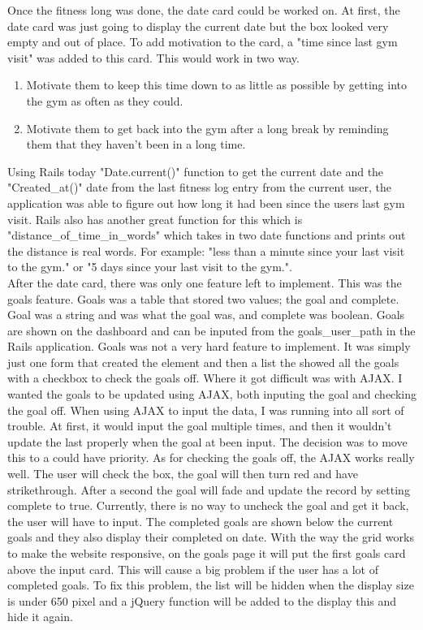 Once the fitness long was done, the date card could be worked on. At first, the date card was just going to display the current date but the box looked very empty and out of place. To add motivation to the card, a "time since last gym visit" was added to this card. This would work in two way. 

\begin{enumerate}
\item Motivate them to keep this time down to as little as possible by getting into the gym as often as they could.
\item Motivate them to get back into the gym after a long break by reminding them that they haven't been in a long time.
\end{enumerate}

Using Rails today "Date.current()" function to get the current date and the "Created_at()" date from the last fitness log entry from the current user, the application was able to figure out how long it had been since the users last gym visit. Rails also has another great function for this which is "distance_of_time_in_words" which takes in two date functions and prints out the distance is real words. For example: "less than a minute since your last visit to the gym." or "5 days since your last visit to the gym.".\\

After the date card, there was only one feature left to implement. This was the goals feature. Goals was a table that stored two values; the goal and complete. Goal was a string and was what the goal was, and complete was boolean. Goals are shown on the dashboard and can be inputed from the goals_user_path in the Rails application. Goals was not a very hard feature to implement. It was simply just one form that created the element and then a list the showed all the goals with a checkbox to check the goals off. Where it got difficult was with AJAX. I wanted the goals to be updated using AJAX, both inputing the goal and checking the goal off. When using AJAX to input the data, I was running into all sort of trouble. At first, it would input the goal multiple times, and then it wouldn't update the last properly when the goal at been input. The decision was to move this to a could have priority. As for checking the goals off, the AJAX works really well. The user will check the box, the goal will then turn red and have strikethrough. After a second the goal will fade and update the record by setting complete to true. Currently, there is no way to uncheck the goal and get it back, the user will have to input. The completed goals are shown below the current goals and they also display their completed on date. With the way the grid works to make the website responsive, on the goals page it will put the first goals card above the input card. This will cause a big problem if the user has a lot of completed goals. To fix this problem, the list will be hidden when the display size is under 650 pixel and a jQuery function will be added to the display this and hide it again.\\

